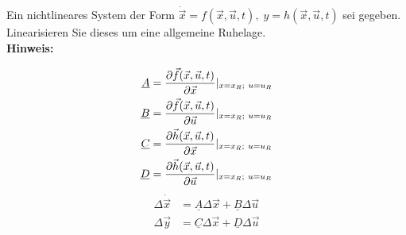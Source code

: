 \begin{question}[section=2,name={Nichtlineares System},difficulty=4,type=mdl,tags={}]
	Ein nichtlineares System der Form $\dot{\vec x} = f(\vec x,\vec u, t),\; y = h(\vec x,\vec u, t)$ sei gegeben. Linearisieren Sie dieses um eine allgemeine Ruhelage.
	\\ \textbf{Hinweis:}\\
	
\end{question}
\begin{solution}
	\begin{align}
		\underline A &= \frac{\partial \vec f(\vec x,\vec u, t)}{\partial \vec x}\arrowvert_{x=x_R; ~u=u_R}\\
		\underline B &= \frac{\partial \vec f(\vec x,\vec u, t)}{\partial \vec u}\arrowvert_{x=x_R; ~u=u_R}\\
		\underline C &= \frac{\partial \vec h(\vec x,\vec u, t)}{\partial \vec x}\arrowvert_{x=x_R; ~u=u_R}\\
		\underline D &= \frac{\partial \vec h(\vec x,\vec u, t)}{\partial \vec u}\arrowvert_{x=x_R; ~u=u_R}
	\end{align}
	\begin{align}
		\Delta \dot{\vec x}&=\underline A \Delta \vec x + \underline B \Delta \vec u\\
		\Delta \vec y &= \underline C \Delta \vec x + \underline D \Delta \vec u
	\end{align}
\end{solution}